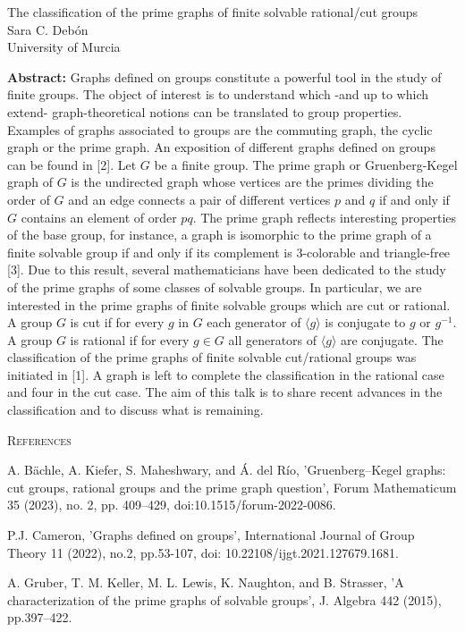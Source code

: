 \documentclass[12pt,a4paper]{article}
\begin{document}
\thispagestyle{empty} 
\begin{center}
{\large  The classification of the prime graphs of finite solvable rational/cut groups}\\
\vspace*{.5cm}
Sara C. Deb\'on\\
University of Murcia\\
\end{center}
\vspace*{.8cm}

{\bf Abstract:} Graphs defined on groups constitute a powerful tool in the study of finite groups. The object of interest is to understand which -and up to which extend- graph-theoretical notions can be translated to group properties. Examples of graphs associated to groups are the commuting graph, the cyclic graph or the prime graph. An exposition of different graphs defined on groups can be found in [2]. 
	Let $G$ be a finite group. The prime graph or Gruenberg-Kegel graph of $G$ is the undirected graph whose vertices are the primes dividing the order of $G$ and an edge connects a pair of different vertices $p$ and $q$ if and only if $G$ contains an element of order $pq$. The prime graph reflects interesting properties of the base group, for instance, a graph is isomorphic to the prime graph of a finite solvable group if and only if its complement is 3-colorable and triangle-free [3]. Due to this result, several mathematicians have been dedicated to the study of the prime graphs of some classes of solvable groups. In particular, we are interested in the prime graphs of finite solvable groups which are cut or rational.  
	A group $G$ is cut if for every $g$ in $G$ each generator of $\langle g \rangle$ is conjugate to $g$ or $g^{-1}$. A group $G$ is rational if for every $g \in G$ all generators of $\langle g \rangle$ are conjugate. The classification of the prime graphs of finite solvable cut/rational groups was initiated in [1]. A graph is left to complete the classification in the rational case and four in the cut case. The aim of this talk is to share recent advances in the classification and to discuss what is remaining.


\bigskip
\textsc{References}

\begin{enumerate}[label={[\arabic*]}]
\item A. Bächle, A. Kiefer, S. Maheshwary, and \'A. del Río, 'Gruenberg–Kegel graphs: cut groups, rational groups and the prime graph question', Forum Mathematicum 35 (2023), no. 2, pp. 409–429, doi:10.1515/forum-2022-0086.
\item P.J. Cameron, 'Graphs defined on groups', International Journal of Group Theory 11 (2022), no.2, pp.53-107, doi: 10.22108/ijgt.2021.127679.1681.
\item A. Gruber, T. M. Keller, M. L. Lewis, K. Naughton, and B. Strasser, 'A characterization of the prime graphs of solvable groups', J. Algebra 442 (2015), pp.397–422.
\end{enumerate}
\end{document}
